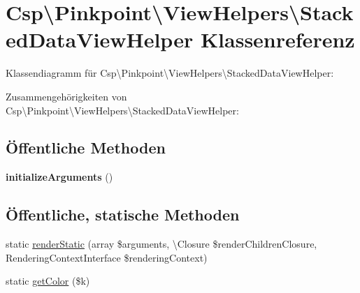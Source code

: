 \hypertarget{classCsp_1_1Pinkpoint_1_1ViewHelpers_1_1StackedDataViewHelper}{}\section{Csp\textbackslash{}Pinkpoint\textbackslash{}View\+Helpers\textbackslash{}Stacked\+Data\+View\+Helper Klassenreferenz}
\label{classCsp_1_1Pinkpoint_1_1ViewHelpers_1_1StackedDataViewHelper}


Klassendiagramm für Csp\textbackslash{}Pinkpoint\textbackslash{}View\+Helpers\textbackslash{}Stacked\+Data\+View\+Helper\+:


Zusammengehörigkeiten von Csp\textbackslash{}Pinkpoint\textbackslash{}View\+Helpers\textbackslash{}Stacked\+Data\+View\+Helper\+:
\subsection*{Öffentliche Methoden}
\begin{DoxyCompactItemize}
\item 
\mbox{\label{classCsp_1_1Pinkpoint_1_1ViewHelpers_1_1StackedDataViewHelper_a20b0a5d4ae1726b44afaf2456dec79f2}} 
{\bfseries initialize\+Arguments} ()
\end{DoxyCompactItemize}
\subsection*{Öffentliche, statische Methoden}
\begin{DoxyCompactItemize}
\item 
static \hyperlink{classCsp_1_1Pinkpoint_1_1ViewHelpers_1_1StackedDataViewHelper_a8ef2e577d2a2daf33f0ab7f81cc1cf48}{render\+Static} (array \$arguments, \textbackslash{}Closure \$render\+Children\+Closure, Rendering\+Context\+Interface \$rendering\+Context)
\item 
static \hyperlink{classCsp_1_1Pinkpoint_1_1ViewHelpers_1_1StackedDataViewHelper_a56ba245db8f839b90adc94fec0e53af3}{get\+Color} (\$k)
\end{DoxyCompactItemize}
